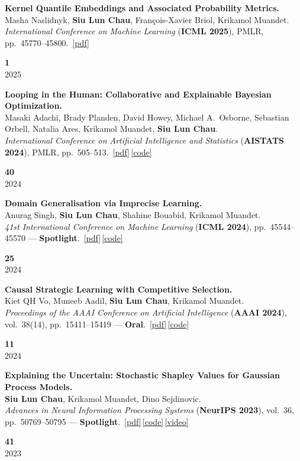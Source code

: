 \documentclass[11pt,a4paper]{article}
\newcommand{\me}{\textbf{Siu Lun Chau}}
\newcommand{\acro}[1]{\textcolor{accent}{\textbf{#1}}}
\newcommand{\award}[1]{\textcolor{award}{\textbf{#1}}}
\newcommand{\venue}[2]{\textit{#1} (\acro{#2})}
\newcommand{\pdfb}[1]{\,\href{#1}{\textcolor{accent}{\small[pdf]}}}
\newcommand{\codeb}[1]{\,\href{#1}{\textcolor{accent}{\small[code]}}}
\newcommand{\videob}[1]{\,\href{#1}{\textcolor{accent}{\small[video]}}}
\newlength{\citecolwidth}\setlength{\citecolwidth}{2.4cm}
\newlength{\indexcolwidth}\setlength{\indexcolwidth}{3.2em}
\newcommand{\citebox}[2]{%
  {\color{citecol}\textbf{\large #1}}\\[1pt]
  {\color{mutedgrey}\small #2}%
}
\newcommand{\pubentry}[4]{%
  \noindent
  \makebox[\indexcolwidth][l]{\textbf{[#1]}}%
  \begin{minipage}[t]{\dimexpr\linewidth-\indexcolwidth-\citecolwidth-0.4em\relax}#2\end{minipage}%
  \hspace{0.4em}%
  \begin{minipage}[t]{\citecolwidth}\raggedleft\citebox{#3}{#4}\end{minipage}%
  \par\vspace{6pt}}
\begin{document}
\pubentry{C8}{%
\textbf{Kernel Quantile Embeddings and Associated Probability Metrics.}\\
Masha Naslidnyk, \me, Fran\c cois-Xavier Briol, Krikamol Muandet.\\
\venue{International Conference on Machine Learning}{ICML 2025}, PMLR, pp.~45770--45800.%
\pdfb{https://arxiv.org/pdf/2505.20433}%
}{1}{2025}

\pubentry{C9}{%
\textbf{Looping in the Human: Collaborative and Explainable Bayesian Optimization.}\\
Masaki Adachi, Brady Planden, David Howey, Michael A.\ Osborne, Sebastian Orbell, Natalia Ares, Krikamol Muandet, \me.\\
\venue{International Conference on Artificial Intelligence and Statistics}{AISTATS 2024}, PMLR, pp.~505--513.%
\pdfb{https://arxiv.org/pdf/2310.17273.pdf}\codeb{https://anonymous.4open.science/r/CoExBO-4B06/}%
}{40}{2024}

\pubentry{C10}{%
\textbf{Domain Generalisation via Imprecise Learning.}\\
Anurag Singh, \me, Shahine Bouabid, Krikamol Muandet.\\
\venue{41st International Conference on Machine Learning}{ICML 2024}, pp.~45544--45570 --- \award{Spotlight}.%
\pdfb{https://arxiv.org/pdf/2404.04669}\codeb{https://github.com/muandet-lab/dgil}%
}{25}{2024}

\pubentry{C11}{%
\textbf{Causal Strategic Learning with Competitive Selection.}\\
Kiet QH Vo, Muneeb Aadil, \me, Krikamol Muandet.\\
\venue{Proceedings of the AAAI Conference on Artificial Intelligence}{AAAI 2024}, vol.~38(14), pp.~15411--15419 --- \award{Oral}.%
\pdfb{https://arxiv.org/pdf/2308.16262.pdf}\codeb{https://github.com/muandet-lab/causal-strategic-learning-with-selection}%
}{11}{2024}

\pubentry{C12}{%
\textbf{Explaining the Uncertain: Stochastic Shapley Values for Gaussian Process Models.}\\
\me, Krikamol Muandet, Dino Sejdinovic.\\
\venue{Advances in Neural Information Processing Systems}{NeurIPS 2023}, vol.~36, pp.~50769--50795 --- \award{Spotlight}.%
\pdfb{https://arxiv.org/pdf/2305.15167.pdf}\codeb{https://github.com/muandet-lab/ExplainingGaussianProcess}\videob{https://slideslive.com/39009992/explaining-the-uncertain-stochastic-shapley-values-for-gaussian-process-models}%
}{41}{2023}
\end{document}
